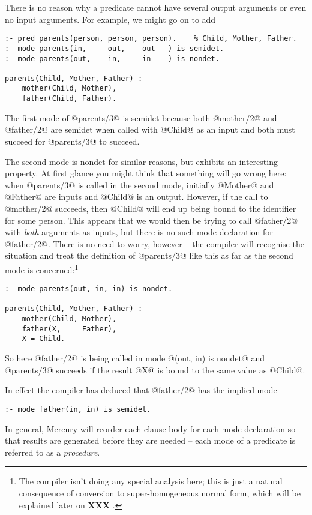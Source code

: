 \documentclass[a4paper,11pt,notitlepage,onecolumn]{article}
\newcommand{\XXX}[1]%
{{\small\textbf{XXX} \emph{#1}}}
\begin{document}
There is no reason why a predicate cannot have several output
arguments or even no input arguments.  For example, we
might go on to add
\begin{verbatim}
:- pred parents(person, person, person).    % Child, Mother, Father.
:- mode parents(in,     out,    out   ) is semidet.
:- mode parents(out,    in,     in    ) is nondet.

parents(Child, Mother, Father) :-
    mother(Child, Mother),
    father(Child, Father).
\end{verbatim}
The first mode of @parents/3@ is semidet because both @mother/2@
and @father/2@ are semidet when called with @Child@ as an input
and both must succeed for @parents/3@ to succeed.

The second mode is nondet for similar reasons, but exhibits an
interesting property.  At first glance you might think that
something will go wrong here: when @parents/3@ is called in the
second mode, initially @Mother@ and @Father@ are inputs and @Child@
is an output.  However, if the call to @mother/2@ succeeds, then
@Child@ will end up being bound to the identifier for some
person.  This appears that we would then be trying to call
@father/2@ with \emph{both} arguments as inputs, but there is no such
mode declaration for @father/2@.  There is no need to worry,
however -- the compiler will recognise the situation and treat
the definition of @parents/3@ like this as far as the second
mode is concerned:\footnote{The compiler isn't doing any special analysis here;
this is just a natural consequence of conversion to
super-homogeneous normal form, which will be explained later
on \XXX{}.}
\begin{verbatim}
:- mode parents(out, in, in) is nondet.

parents(Child, Mother, Father) :-
    mother(Child, Mother),
    father(X,     Father),
    X = Child.
\end{verbatim}
So here @father/2@ is being called in mode @(out, in) is nondet@ and
@parents/3@ succeeds if the result @X@ is bound to the same value
as @Child@.

In effect the compiler has deduced that @father/2@ has the
implied mode
\begin{verbatim}
:- mode father(in, in) is semidet.
\end{verbatim}
In general, Mercury will reorder each clause body for each mode
declaration so that results are generated before they are needed -- each
mode of a predicate is referred to as a \emph{procedure}.
\end{document}
